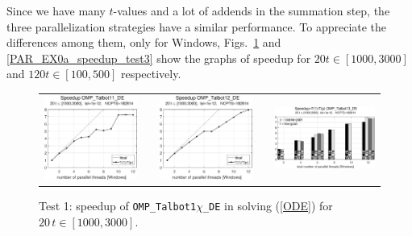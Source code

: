 \documentclass[a4paper,10pt]{report}%
\begin{document}
\newpage
\noindent Since we have many $t$-values and a lot of addends in the summation step, the three parallelization
strategies have a similar performance. To appreciate the differences among them, only for Windows,
Figs.~\ref{PAR_EX0a_speedup_test1} and \ref{PAR_EX0a_speedup_test3} show the graphs of speedup for
$20t\in[1000,3000]$ and $120t\in[100,500]$ respectively.
\begin{figure}[htb]
\centering
\begin{tabular}{ccccc}
\includegraphics[height=0.2\textwidth]{./FIGS/EX0a/EX0a_test1_speedup_11_Windows.eps} &&
\includegraphics[height=0.2\textwidth]{./FIGS/EX0a/EX0a_test1_speedup_12_Windows.eps} &&
\includegraphics[height=0.2\textwidth,keepaspectratio=true]{./FIGS/EX0a/EX0a_test1_speedup_13_Windows.eps}
\end{tabular}
\caption{\small Test 1: speedup of {\tt OMP\_Talbot1$\chi$\_DE} in solving (\ref{ODE}) for $20\,t\in[1000,3000]$.}
\label{PAR_EX0a_speedup_test1}
\end{figure}
\end{document}
